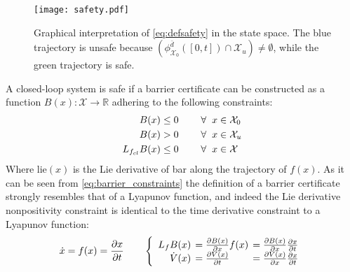 \begin{figure}[H]
	\center
	\texttt{[image: safety.pdf]}	
	\caption{Graphical interpretation of \autoref{eq:defsafety} in the state space. The blue trajectory is unsafe because $\left( \phi_{\mathcal{X}_0}^{\bar{d}}([0,t]) \cap \mathcal{X}_u \right) \neq \emptyset$, while the green trajectory is safe.}
	\label{fig:defsafety}
\end{figure}
\label{def_safety}


A closed-loop system is safe if a barrier certificate can be constructed as a function $B(x):\mathcal{X} \rightarrow \mathbb{R}$ adhering to the following constraints:
\begin{subequations}\label{eq:barrier_constraints}
\begin{flalign}
B(x) &\leq 0 \hspace{0.8cm}  \forall \hspace{2mm} x \in \mathcal{X}_0  \label{cer1}\\
B(x) &> 0  \hspace{0.8cm}  \forall \hspace{2mm} x \in \mathcal{X}_u \label{cer2} \\
L_{f_{cl}}B(x) &\leq 0 \hspace{0.8cm}  \forall \hspace{2mm} x \in \mathcal{X} \label{cer3}
\end{flalign}
\end{subequations}
Where \gls{lie}$(x)$ is the Lie derivative of \gls{bar} along the trajectory of $f(x)$. As it can be seen from \autoref{eq:barrier_constraints} the definition of a barrier certificate strongly resembles that of a Lyapunov function, and indeed the Lie derivative nonpositivity constraint is identical to the time derivative constraint to a Lyapunov function:
\begin{equation}
\dot{x}  = f(x) = \frac{\partial x}{\partial t} \qquad
\left\{ \begin{array}{r l l}
L_fB(x) \hspace*{-2mm}&= \tfrac{\partial B(x)}{\partial x} f(x) \hspace*{-2mm}&= \tfrac{\partial B(x)}{\partial x} \frac{\partial x}{\partial t}\\
\dot{V}(x) \hspace*{-2mm}&= \tfrac{\partial V(x)}{\partial t} \hspace*{-2mm}&= \tfrac{\partial V(x)}{\partial x}\tfrac{\partial x}{\partial t}
\end{array} \right. \label{eq:dBdt_dVdt}
\end{equation}

